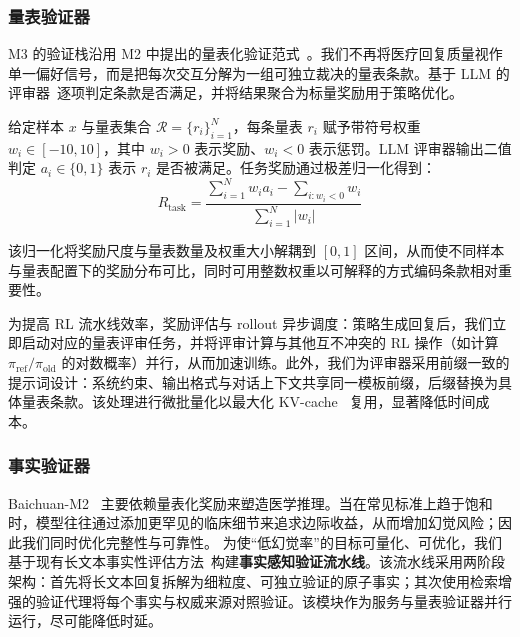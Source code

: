 \subsubsection{量表验证器}
M3 的验证栈沿用 M2 中提出的量表化验证范式~\cite{DBLP:journals/corr/abs-2508-12790,DBLP:journals/corr/abs-2507-17746,baichuan-m2}。我们不再将医疗回复质量视作单一偏好信号，而是把每次交互分解为一组可独立裁决的量表条款。基于 LLM 的评审器~\cite{DBLP:journals/corr/abs-2411-15594}逐项判定条款是否满足，并将结果聚合为标量奖励用于策略优化。


给定样本 $x$ 与量表集合 $\mathcal{R}=\{r_i\}_{i=1}^N$，每条量表 $r_i$ 赋予带符号权重 $w_i\in[-10,10]$，其中 $w_i>0$ 表示奖励、$w_i<0$ 表示惩罚。LLM 评审器输出二值判定 $a_i\in\{0,1\}$ 表示 $r_i$ 是否被满足。任务奖励通过极差归一化得到：
\begin{equation}
R_{\text{task}}
=\frac{\sum_{i=1}^N w_i a_i-\sum_{i:w_i<0} w_i}{\sum_{i=1}^N |w_i|}
\end{equation}

该归一化将奖励尺度与量表数量及权重大小解耦到 $[0,1]$ 区间，从而使不同样本与量表配置下的奖励分布可比，同时可用整数权重以可解释的方式编码条款相对重要性。

为提高 RL 流水线效率，奖励评估与 rollout 异步调度：策略生成回复后，我们立即启动对应的量表评审任务，并将评审计算与其他互不冲突的 RL 操作（如计算 $\pi_\text{ref}/\pi_\text{old}$ 的对数概率）并行，从而加速训练。此外，我们为评审器采用前缀一致的提示词设计：系统约束、输出格式与对话上下文共享同一模板前缀，后缀替换为具体量表条款。该处理进行微批量化以最大化 KV-cache~\cite{DBLP:journals/tmlr/0002LTTXCHD0025} 复用，显著降低时间成本。

\subsubsection{事实验证器}
\label{sec:fact-verifier}
Baichuan-M2~\cite{baichuan-m2} 主要依赖量表化奖励来塑造医学推理。当在常见标准上趋于饱和时，模型往往通过添加更罕见的临床细节来追求边际收益，从而增加幻觉风险；因此我们同时优化完整性与可靠性。
为使“低幻觉率”的目标可量化、可优化，我们基于现有长文本事实性评估方法~\cite{DBLP:conf/emnlp/MinKLLYKIZH23,wei2024long}构建\textbf{事实感知验证流水线}。该流水线采用两阶段架构：首先将长文本回复拆解为细粒度、可独立验证的原子事实；其次使用检索增强的验证代理将每个事实与权威来源对照验证。该模块作为服务与量表验证器并行运行，尽可能降低时延。

